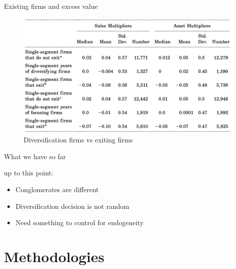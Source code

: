 \documentclass[aspectratio=169,xcolor=dvipsnames]{beamer}
\begin{document}
\begin{frame}{Existing firms and excess value}
    \begin{figure}
        \includegraphics[width=0.85\linewidth]{figures/table6.png}
        \caption{Diversification firms vs exiting firms}
    \end{figure}
\end{frame}

\begin{frame}{What we have so far}
    \begin{block}{up to this point:}
        \begin{itemize}
            \item Conglomerates are different
            \item Diversification decision is not random
            \item Need something to control for endogeneity
        \end{itemize}
    \end{block}
\end{frame}

\section{Methodologies}
\end{document}

